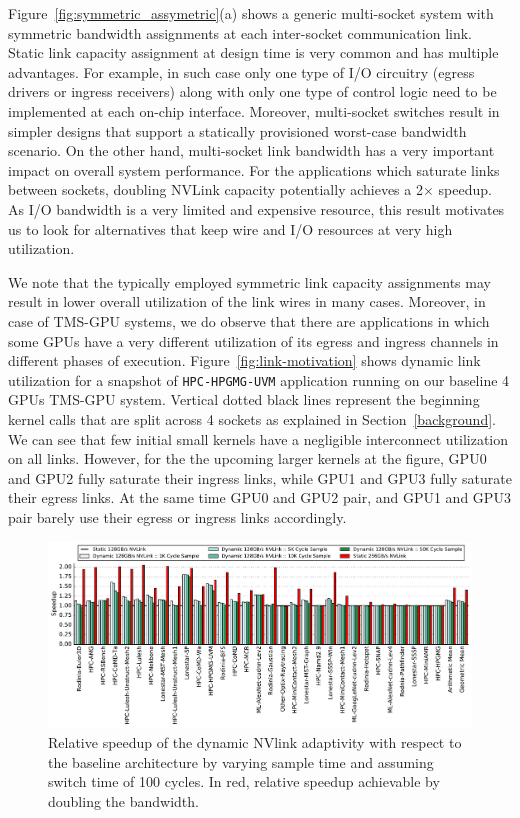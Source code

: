 Figure~\ref{fig:symmetric_assymetric}(a) shows a generic multi-socket system
with symmetric bandwidth assignments at each inter-socket communication link.
Static link capacity assignment at design time is very common and has multiple
advantages. For example, in such case only one type of I/O circuitry (egress
drivers or ingress receivers) along with only one type of control logic need to
be implemented at each on-chip interface. Moreover, multi-socket switches
result in simpler designs that support a statically provisioned worst-case
bandwidth scenario. On the other hand, multi-socket link bandwidth has a very
important impact on overall system performance. For the applications which saturate links between sockets, doubling NVLink capacity potentially achieves a 2$\times$ speedup.
As I/O bandwidth is a very limited and expensive resource, this
result motivates us to look for alternatives that keep wire and I/O resources
at very high utilization. 

We note that the typically employed symmetric link
capacity assignments may result in lower overall utilization of the link wires
in many cases. Moreover, in case of TMS-GPU systems, we do observe that there
are applications in which some GPUs have a very different utilization of its
egress and ingress channels in different phases of execution.
Figure~\ref{fig:link-motivation} shows dynamic link utilization for a snapshot
of \texttt{HPC-HPGMG-UVM} application running on our baseline 4 GPUs TMS-GPU
system. Vertical dotted black lines represent the beginning kernel calls that
are split across 4 sockets as explained in Section~\ref{background}. We can see
that few initial small kernels have a negligible interconnect
utilization on all links. However, for the the upcoming larger kernels at the
figure, GPU0 and GPU2 fully saturate their ingress links, while GPU1 and GPU3
fully saturate their egress links. At the same time GPU0 and GPU2 pair,
and GPU1 and GPU3 pair barely use their egress or ingress links accordingly.

\begin{figure}[tp]
    \centering
    \includegraphics[width=1.0\textwidth]{figures/plot_nvlink_sample_time.pdf}
    \caption{Relative speedup of the dynamic NVlink adaptivity with respect to
	the baseline architecture by varying sample time and assuming switch time of
	100 cycles. In red, relative speedup achievable by doubling the bandwidth.}
    \label{fig:sampletime}
\end{figure}

